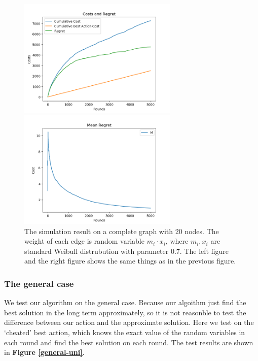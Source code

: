 \documentclass{article}
\theoremstyle{plain}
\theoremstyle{definition}
\theoremstyle{remark}
\begin{document}
    \begin{figure}[htbp!]
        \begin{minipage}[h]{0.5\linewidth}
            \centering
            \includegraphics[width=3in]{simple-cost-regret-weibull07.png}
        \end{minipage}
        \begin{minipage}[h]{0.5\linewidth}
            \centering
            \includegraphics[width=3in]{simple-mean-regret-weibull07.png}
        \end{minipage}
        \caption{The simulation result on a complete graph with 20 nodes. The weight of each edge is random variable $m_i \cdot x_i$, where $m_i,x_i$ are standard Weibull distrubution with parameter $0.7$. The left figure and the right figure shows the same things as in the previous figure.}
        \label{center-weibull07}
    \end{figure}

    \subsubsection{The general case}

    We test our algorithm on the general case. Because our algoithm just find the best solution in the long term approximately, so it is not reasonble to test the difference between our action and the approximate solution. Here we test on the `cheated' best action, which knows the exact value of the random variables in each round and find the best solution on each round. The test results are shown in \textbf{Figure \ref{general-uni}}.
\end{document}
